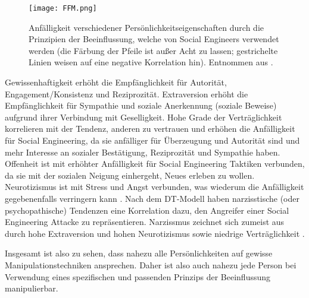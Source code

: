 \begin{figure}[!htp]
    \centering
    \texttt{[image: FFM.png]}
    \caption{Anfälligkeit verschiedener Persönlichkeitseigenschaften durch die Prinzipien der Beeinflussung, welche von Social Engineers verwendet werden (die Färbung der Pfeile ist außer Acht zu lassen; gestrichelte Linien weisen auf eine negative Korrelation hin). Entnommen aus .}
\end{figure}
\FloatBarrier

Gewissenhaftigkeit erhöht die Empfänglichkeit für Autorität, Engagement/Konsistenz und Reziprozität.
Extraversion erhöht die Empfänglichkeit für Sympathie und soziale Anerkennung (soziale Beweise) aufgrund ihrer Verbindung mit Geselligkeit.
Hohe Grade der Verträglichkeit korrelieren mit der Tendenz, anderen zu vertrauen und erhöhen die Anfälligkeit für Social Engineering, da sie anfälliger für Überzeugung und Autorität sind
und mehr Interesse an sozialer Bestätigung, Reziprozität und Sympathie haben.
Offenheit ist mit erhöhter Anfälligkeit für Social Engineering Taktiken verbunden, da sie mit der sozialen Neigung einhergeht, Neues erleben zu wollen.
Neurotizismus ist mit Stress und Angst verbunden, was wiederum die Anfälligkeit gegebenenfalls verringern kann .
\newpage
Nach dem DT-Modell haben narzisstische (oder psychopathische) Tendenzen eine Korrelation dazu, den Angreifer einer Social Engineering Attacke zu repräsentieren.
Narzissmus zeichnet sich zumeist aus durch hohe Extraversion und hohen Neurotizismus sowie niedrige Verträglichkeit .

Insgesamt ist also zu sehen, dass nahezu alle Persönlichkeiten auf gewisse Manipulationstechniken ansprechen.
Daher ist also auch nahezu jede Person bei Verwendung eines spezifischen und passenden Prinzips der Beeinflussung manipulierbar.
